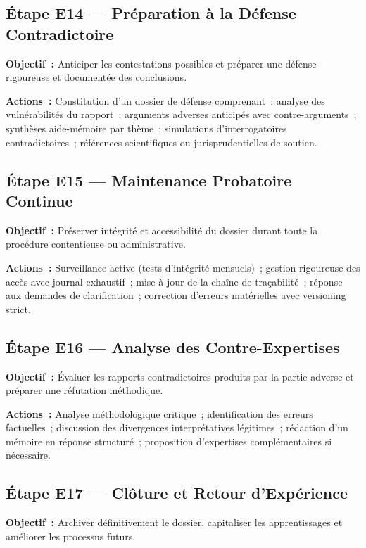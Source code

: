 \subsection{Étape E14 --- Préparation à la Défense Contradictoire}

\textbf{Objectif~:} Anticiper les contestations possibles et préparer une défense
rigoureuse et documentée des conclusions.

\textbf{Actions~:} Constitution d'un dossier de défense comprenant~: analyse
des vulnérabilités du rapport~; arguments adverses anticipés avec contre-arguments~;
synthèses aide-mémoire par thème~; simulations d'interrogatoires contradictoires~;
références scientifiques ou jurisprudentielles de soutien.

\subsection{Étape E15 --- Maintenance Probatoire Continue}

\textbf{Objectif~:} Préserver intégrité et accessibilité du dossier durant toute
la procédure contentieuse ou administrative.

\textbf{Actions~:} Surveillance active (tests d'intégrité mensuels)~;
gestion rigoureuse des accès avec journal exhaustif~;
mise à jour de la chaîne de traçabilité~;
réponse aux demandes de clarification~;
correction d'erreurs matérielles avec versioning strict.

\subsection{Étape E16 --- Analyse des Contre-Expertises}

\textbf{Objectif~:} Évaluer les rapports contradictoires produits par la partie
adverse et préparer une réfutation méthodique.

\textbf{Actions~:} Analyse méthodologique critique~;
identification des erreurs factuelles~;
discussion des divergences interprétatives légitimes~;
rédaction d'un mémoire en réponse structuré~;
proposition d'expertises complémentaires si nécessaire.

\subsection{Étape E17 --- Clôture et Retour d'Expérience}

\textbf{Objectif~:} Archiver définitivement le dossier, capitaliser les
apprentissages et améliorer les processus futurs.

